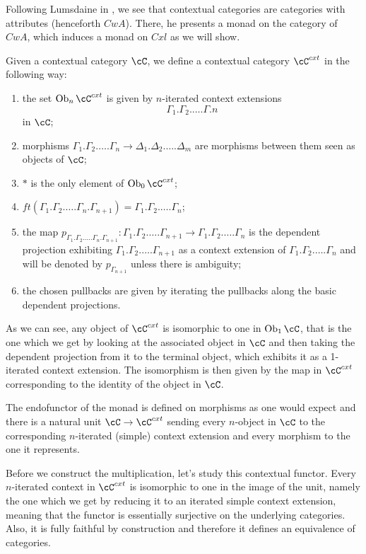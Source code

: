 \documentclass[a4paper,fontsize=12pt]{scrartcl}
\begin{document}
\begin{construction}
  Following Lumsdaine in , we see that contextual categories
  are categories with attributes (henceforth $CwA$). There, he presents a monad
  on the category of $CwA$, which induces a monad on $Cxl$ as we will show.

  Given a contextual category $\cC$, we define a contextual category $\cC^{cxt}$
  in the following way:
  \begin{enumerate}
    \item the set $\Ob_n\cC^{cxt}$ is given by $n$-iterated context extensions
      \[\Gamma_1.\Gamma_2.\ldots.\Gamma.n\]
      in $\cC$;
    \item morphisms
      $\Gamma_1.\Gamma_2.\ldots.\Gamma_n\rightarrow\Delta_1.\Delta_2.\ldots.\Delta_m$
      are morphisms between them seen as objects of $\cC$;
    \item $*$ is the only element of $\Ob_0\cC^{cxt}$;
    \item
      $ft(\Gamma_1.\Gamma_2.\ldots.\Gamma_n.\Gamma_{n+1})=\Gamma_1.\Gamma_2.\ldots.\Gamma_n$;
    \item the map $p_{\Gamma_1.\Gamma_2.\ldots.\Gamma_n.\Gamma_{n+1}}\colon
      \Gamma_1.\Gamma_2.\ldots.\Gamma_{n+1}\rightarrow
      \Gamma_1.\Gamma_2.\ldots.\Gamma_n$ is the dependent projection exhibiting
      $\Gamma_1.\Gamma_2.\ldots.\Gamma_{n+1}$ as a context extension of
      $\Gamma_1.\Gamma_2.\ldots.\Gamma_n$ and will be denoted by
      $p_{\Gamma_{n+1}}$ unless there is ambiguity;
    \item the chosen pullbacks are given by iterating the pullbacks along the
      basic dependent projections.
  \end{enumerate}

  As we can see, any object of $\cC^{cxt}$ is isomorphic to one in
  $\Ob_1\cC$, that is the one which we get by looking at the associated object
  in $\cC$ and then taking the dependent projection from it to the terminal
  object, which exhibits it as a 1-iterated context extension. The isomorphism
  is then given by the map in $\cC^{cxt}$ corresponding to the identity of the
  object in $\cC$.

  The endofunctor of the monad is defined on morphisms as one would expect  and there is
  a natural unit $\cC\rightarrow\cC^{cxt}$ sending every $n$-object in $\cC$ to
  the corresponding $n$-iterated (simple) context extension and every morphism
  to the one it represents.

  Before we construct the multiplication, let's study this contextual functor.
  Every $n$-iterated
  context in $\cC^{cxt}$ is isomorphic to one in the image of the unit, namely
  the one which we get by reducing it to an iterated simple context extension,
  meaning that the functor is essentially surjective on the
  underlying categories. Also, it is fully faithful by construction and
  therefore it defines an equivalence of categories.


\end{construction}
\end{document}
